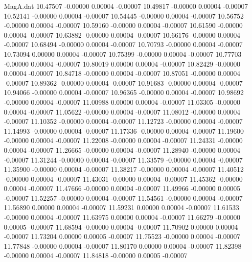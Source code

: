 \begin{filecontents}{MagA.dat}
  10.47507   -0.00000    0.00004   -0.00007
  10.49817   -0.00000    0.00004   -0.00007
  10.52141   -0.00000    0.00004   -0.00007
  10.54445   -0.00000    0.00004   -0.00007
  10.56752   -0.00000    0.00004   -0.00007
  10.59160   -0.00000    0.00004   -0.00007
  10.61590   -0.00000    0.00004   -0.00007
  10.63882   -0.00000    0.00004   -0.00007
  10.66176   -0.00000    0.00004   -0.00007
  10.68494   -0.00000    0.00004   -0.00007
  10.70793   -0.00000    0.00004   -0.00007
  10.73094    0.00000    0.00004   -0.00007
  10.75399   -0.00000    0.00004   -0.00007
  10.77703   -0.00000    0.00004   -0.00007
  10.80019    0.00000    0.00004   -0.00007
  10.82429   -0.00000    0.00004   -0.00007
  10.84718   -0.00000    0.00004   -0.00007
  10.87051   -0.00000    0.00004   -0.00007
  10.89362   -0.00000    0.00004   -0.00007
  10.91683   -0.00000    0.00004   -0.00007
  10.94066   -0.00000    0.00004   -0.00007
  10.96365   -0.00000    0.00004   -0.00007
  10.98692   -0.00000    0.00004   -0.00007
  11.00988    0.00000    0.00004   -0.00007
  11.03305   -0.00000    0.00004   -0.00007
  11.05622   -0.00000    0.00004   -0.00007
  11.08012   -0.00000    0.00004   -0.00007
  11.10352   -0.00000    0.00004   -0.00007
  11.12723   -0.00000    0.00004   -0.00007
  11.14993   -0.00000    0.00004   -0.00007
  11.17336   -0.00000    0.00004   -0.00007
  11.19600   -0.00000    0.00004   -0.00007
  11.22008   -0.00000    0.00004   -0.00007
  11.24331   -0.00000    0.00004   -0.00007
  11.26665   -0.00000    0.00004   -0.00007
  11.28940   -0.00000    0.00004   -0.00007
  11.31244   -0.00000    0.00004   -0.00007
  11.33579   -0.00000    0.00004   -0.00007
  11.35900   -0.00000    0.00004   -0.00007
  11.38217   -0.00000    0.00004   -0.00007
  11.40512   -0.00000    0.00004   -0.00007
  11.43031   -0.00000    0.00004   -0.00007
  11.45362   -0.00000    0.00004   -0.00007
  11.47666   -0.00000    0.00004   -0.00007
  11.49966   -0.00000    0.00005   -0.00007
  11.52257   -0.00000    0.00004   -0.00007
  11.54561   -0.00000    0.00004   -0.00007
  11.56890    0.00000    0.00004   -0.00007
  11.59231    0.00000    0.00004   -0.00007
  11.61533   -0.00000    0.00004   -0.00007
  11.63975    0.00000    0.00004   -0.00007
  11.66279   -0.00000    0.00005   -0.00007
  11.68594   -0.00000    0.00004   -0.00007
  11.70902    0.00000    0.00004   -0.00007
  11.73204    0.00000    0.00005   -0.00007
  11.75523   -0.00000    0.00004   -0.00007
  11.77848   -0.00000    0.00004   -0.00007
  11.80170    0.00000    0.00004   -0.00007
  11.82398   -0.00000    0.00004   -0.00007
  11.84818   -0.00000    0.00005   -0.00007

\end{filecontents}
